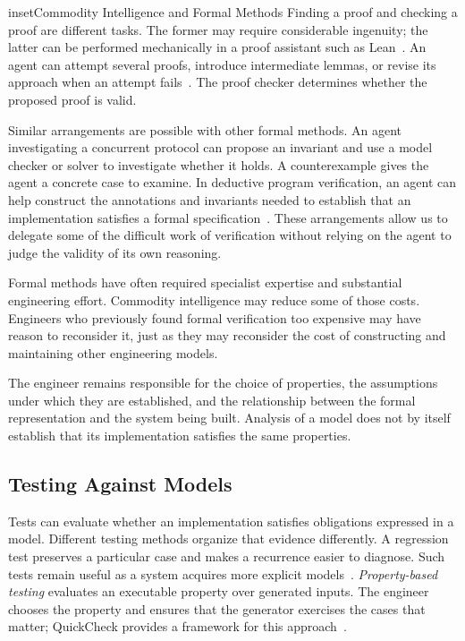 \begin{bookbox}{inset}{Commodity Intelligence and Formal Methods}
\label{inset-commodity-intelligence-and-formal-methods}
Finding a proof and checking a proof are different tasks. The former may require considerable ingenuity; the latter can be performed mechanically in a proof assistant such as Lean~\citep{lean-reference}. An agent can attempt several proofs, introduce intermediate lemmas, or revise its approach when an attempt fails~\citep{yang2023leandojo}. The proof checker determines whether the proposed proof is valid.

Similar arrangements are possible with other formal methods. An agent investigating a concurrent protocol can propose an invariant and use a model checker or solver to investigate whether it holds. A counterexample gives the agent a concrete case to examine. In deductive program verification, an agent can help construct the annotations and invariants needed to establish that an implementation satisfies a formal specification~\citep{poesia2024dafnyannotator}. These arrangements allow us to delegate some of the difficult work of verification without relying on the agent to judge the validity of its own reasoning.

Formal methods have often required specialist expertise and substantial engineering effort. Commodity intelligence may reduce some of those costs. Engineers who previously found formal verification too expensive may have reason to reconsider it, just as they may reconsider the cost of constructing and maintaining other engineering models.

The engineer remains responsible for the choice of properties, the assumptions under which they are established, and the relationship between the formal representation and the system being built. Analysis of a model does not by itself establish that its implementation satisfies the same properties.
\end{bookbox}

\subsection{Testing Against Models}\label{heading:tests-and-models-work-together}


Tests can evaluate whether an implementation satisfies obligations expressed in a model. Different testing methods organize that evidence differently. A regression test preserves a particular case and makes a recurrence easier to diagnose. Such tests remain useful as a system acquires more explicit models~\citep{winters2020}. \emph{Property-based testing} evaluates an executable property over generated inputs. The engineer chooses the property and ensures that the generator exercises the cases that matter; QuickCheck provides a framework for this approach~\citep{claessen2000quickcheck}.

